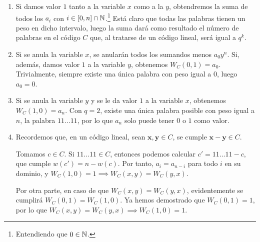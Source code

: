 \begin{enumerate}[label=\alph*)]
	\item Si damos valor $1$ tanto a la variable $x$ como a la $y$, obtendremos la suma de todos los $a_i$ con $i \in [0, n]\cap\mathbb{N}$.\footnote{Entendiendo que $0 \in \mathbb{N}$.} Está claro que todas las palabras tienen un peso en dicho intervalo, luego la suma dará como resultado el número de palabras en el código $C$ que, al tratarse de un código lineal, será igual a $q^k$.
	\item Si se anula la variable $x$, se anularán todos los sumandos menos $a_0y^n$. Si, además, damos valor $1$ a la variable $y$, obtenemos $W_C(0,1) = a_0$. Trivialmente, siempre existe una única palabra con peso igual a $0$, luego $a_0 = 0$.
	\item Si se anula la variable $y$ y se le da valor $1$ a la variable $x$, obtenemos $W_C(1,0) = a_n$. Con $q=2$, existe una única palabra posible con peso igual a $n$, la palabra $11\dots11$, por lo que $a_n$ solo puede tener $0$ o $1$ como valor.
	\item Recordemos que, en un código lineal, sean $\textbf{x}, \textbf{y} \in C$, se cumple $\textbf{x}-\textbf{y} \in C$.
	
	Tomamos $c \in C$. Si $11\dots11 \in C$, entonces podemos calcular $c' = 11\dots11 - c$, que cumple $w(c') = n - w(c)$. Por tanto, $a_i = a_{n-i}$ para todo $i$ en su dominio, y $W_C(1,0) = 1 \implies W_C(x,y) = W_C(y,x)$.
	
	Por otra parte, en caso de que $W_C(x,y) = W_C(y,x)$, evidentemente se cumplirá $W_C(0,1) = W_C(1, 0)$. Ya hemos demostrado que $W_C(0,1) = 1$, por lo que $W_C(x,y) = W_C(y,x) \implies W_C(1,0) = 1$.
\end{enumerate}
